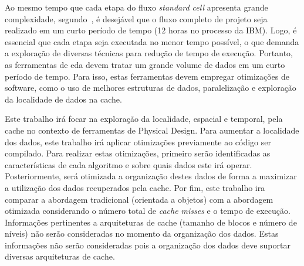 Ao mesmo tempo que cada etapa do fluxo \textit{standard cell} apresenta grande complexidade, segundo~, é desejável que o fluxo completo de projeto seja realizado em um curto período de tempo (12 horas no processo da IBM). Logo, é essencial que cada etapa seja executada no menor tempo possível, o que demanda a exploração de diversas técnicas para redução de tempo de execução.
Portanto, as ferramentas de \ac{eda} devem tratar um grande volume de dados em um curto período de tempo.
Para isso, estas ferramentas devem empregar otimizações de software, como o uso de melhores estruturas de dados, paralelização e exploração da localidade de dados na cache.




Este trabalho irá focar na exploração da localidade, espacial e temporal, pela cache no contexto de ferramentas de Physical Design.
Para aumentar a localidade dos dados, este trabalho irá aplicar otimizações previamente ao código ser compilado.
Para realizar estas otimizações, primeiro serão identificadas as características de cada algoritmo e sobre quais dados este irá operar.
Posteriormente, será otimizada a organização destes dados de forma a maximizar a utilização dos dados recuperados pela cache.
Por fim, este trabalho ira comparar a abordagem tradicional (orientada a objetos) com a abordagem otimizada considerando o número total de \textit{cache misses} e o tempo de execução. Informações pertinentes a arquiteturas de cache (tamanho de blocos e número de níveis) não serão consideradas no momento da organização dos dados.
Estas informações não serão consideradas pois a organização dos dados deve suportar diversas arquiteturas de cache.


